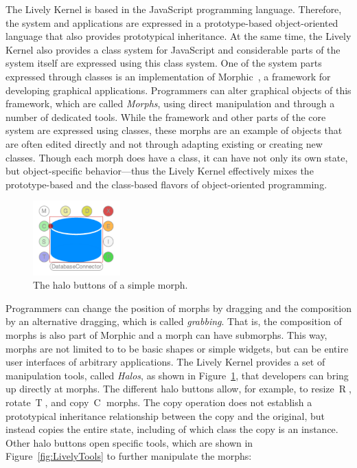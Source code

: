 The Lively Kernel is based in the JavaScript programming language.
Therefore, the system and applications are expressed in a prototype-based object-oriented language that also provides prototypical inheritance.
At the same time, the Lively Kernel also provides a class system for JavaScript and considerable parts of the system itself are expressed using this class system.
One of the system parts expressed through classes is an implementation of Morphic~\cite{Maloney1995Mor}, a framework for developing graphical applications.
Programmers can alter graphical objects of this framework, which are called \emph{Morphs}, using direct manipulation and through a number of dedicated tools.
While the framework and other parts of the core system are expressed using classes, these morphs are an example of objects that are often edited directly and not through adapting existing or creating new classes.
Though each morph does have a class, it can have not only its own state, but object-specific behavior---thus the Lively Kernel effectively mixes the prototype-based and the class-based flavors of object-oriented programming.

\begin{figure}[h]
    \centering
    \includegraphics[width=0.3\textwidth]{figures/2_background/1_halos.pdf}
    \caption{The halo buttons of a simple morph.}
    \label{fig:Halos}
\end{figure}

Programmers can change the position of morphs by dragging and the composition by an alternative dragging, which is called \emph{grabbing}.
That is, the composition of morphs is also part of Morphic and a morph can have submorphs.
This way, morphs are not limited to to be basic shapes or simple widgets, but can be entire user interfaces of arbitrary applications.
The Lively Kernel provides a set of manipulation tools, called \emph{Halos}, as shown in Figure~\ref{fig:Halos}, that developers can bring up directly at morphs.
The different halo buttons allow, for example, to resize~\textcircled{R}, rotate~\textcircled{T}, and copy~\textcircled{C} morphs.
The copy operation does not establish a prototypical inheritance relationship between the copy and the original, but instead copies the entire state, including of which class the copy is an instance.
Other halo buttons open specific tools, which are shown in Figure~\ref{fig:LivelyTools} to further manipulate the morphs:

